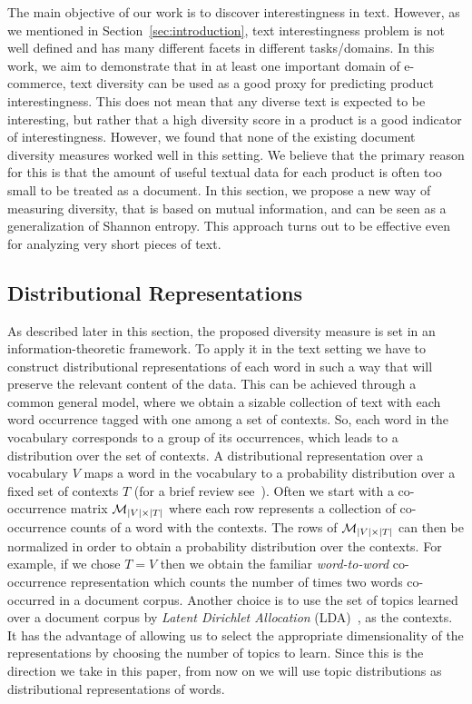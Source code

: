 The main objective of our work is to discover interestingness in text. However,
as we mentioned in Section~\ref{sec:introduction}, text interestingness problem is not well defined and has many different facets in different tasks/domains. In this work, we aim to demonstrate that in at least one important domain of e-commerce, text diversity can be used as a good proxy for 
predicting product interestingness. This does not mean that any diverse text is
expected to be interesting, but rather that a high diversity score in
a product is a good indicator of interestingness. However, we found
that none of the existing document diversity measures worked well in this setting. We believe
that the primary reason for this is that the amount of useful textual
data for each product is often too small to be treated as a document. 
In this section, we propose a new way of measuring diversity, that is
based on mutual information, and can be seen as a generalization of
Shannon entropy. This approach turns out to be effective even for
analyzing very short pieces of text. 


\subsection{Distributional Representations}
\label{sec:distributional-representations}
As described later in this section, the proposed diversity measure
is set in an information-theoretic framework. 
To apply it in the text setting we have to construct distributional
representations of each word in such a way that will preserve the
relevant content of the data.
This can be achieved through a common general model,
where we obtain a sizable collection of text with each word
occurrence tagged with one among a set of
contexts. 
So, each word in the vocabulary
corresponds to a group of its occurrences, which leads to a
distribution over the set of contexts. A distributional representation
over a vocabulary $V$ maps a word in the vocabulary to a  
probability distribution over a fixed set of contexts $T$  (for a brief review
see~\cite{Turian10wordrepresentations}). Often we start with a
co-occurrence matrix ${\mathcal M}_{|V|\times|T|}$ where each row represents a
collection of co-occurrence counts of a word with the contexts. The
rows of ${\mathcal M}_{|V|\times|T|}$ can then  be normalized in order to
obtain a probability distribution over the contexts.
For example, if we chose $T=V$ then we obtain the familiar {\sl
  word-to-word} co-occurrence representation which counts the number 
of times two words co-occurred in a document corpus. Another choice is
to use the set of topics learned over a document 
corpus by {\sl Latent Dirichlet Allocation}
(LDA)~\cite{Blei:2003:LDA:944919.944937}, as the contexts. It has the
advantage of allowing us to select the appropriate dimensionality of
the representations by choosing the number of topics to learn. Since
this is the direction we take in this paper, from now on we will use
topic distributions as distributional representations of words.

